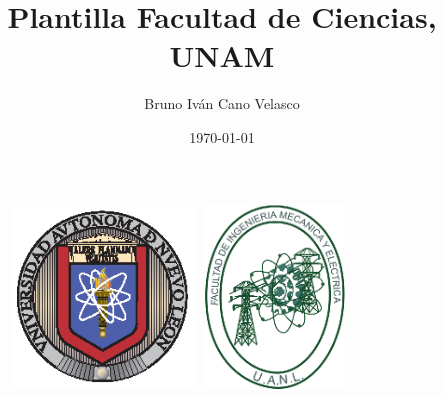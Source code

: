 \documentclass{article}
\title{Plantilla Facultad de Ciencias, UNAM}
\author{Bruno Iván Cano Velasco}
\date{\today}
\begin{document}
\thispagestyle{empty}
	
	\begin{figure}[ht]
			\includegraphics[width=4.9cm]{uanl.eps}
			\label{EscudoUNAM}
	   \endminipage
			\includegraphics[height = 4.9cm ,width=4cm]{fime.eps}
			\label{EscudoFC}
		\endminipage
	\end{figure}
	
\end{document}
